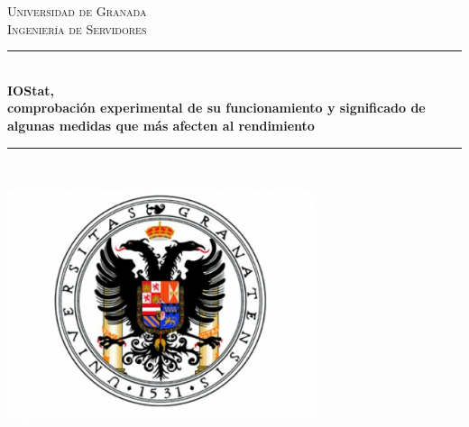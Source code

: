 \documentclass[a4paper,10pt]{article}
\begin{document}
\begin{titlepage}

\newcommand{\HRule}{\rule{\linewidth}{0.5mm}} %

\center %
~\\~\\~\\~\\~\\
\bigskip
\textsc{\LARGE Universidad de Granada}\\[1.5cm]
\textsc{\Large Ingeniería de Servidores}\\[0.5cm] 

\bigskip
\HRule \\[0.4cm]
{ \huge \bfseries IOStat,\\ comprobación experimental de su funcionamiento y significado de algunas medidas
que más afecten al rendimiento	}\\[0.4cm] %
\HRule \\[1.5cm]
 

\begin{minipage}{0.4\textwidth}
\begin{center} \large
\end{center}
\end{minipage}


\begin{center}
\includegraphics[width=9cm]{./ugr.jpg}
\end{center}


\end{titlepage}
\end{document}
